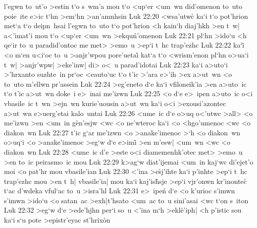 l'egwn
to~ut'o
>estin
t`o
s~wm'a
mou
t`o
<up`er
<um~wn
did'omenon
to~uto
poie~ite
e>ic
t`hn
>em`hn
>an'amnhsin\bibvsend
\vs Luk 22:20
<wsa'utwc\r{}
ka`i
t`o
pot'hrion
met`a
t`o
deipn~hsai
l'egwn
to~uto
t`o
pot'hrion
<h
kain`h
diaj'hkh
>en
t~w|
a<'imat'i
mou
t`o
<up`er
<um~wn
>ekqu\r{n}'omenon\bibvsend
{}
\vs Luk 22:21
pl`hn
>ido`u
<h
qe`ir
to~u
paradid'ontoc
me
met>
>emo~u
>ep`i
t~hc
trap'ezhc\bibvsend
\vs Luk 22:22
ka`i\r{}
<o
m`en
u<i`oc
to~u
>anjr'wpou
pore'uetai\r{}
kat`a
t`o
<wrism'enon
pl`hn
o>ua`i
t~w|
>anjr'wpw|
>eke'inw|
di>
o<~u
parad'idotai\bibvsend
\vs Luk 22:23
ka`i
a>uto`i
>'hrxanto
suzhte~in
pr`oc
<eauto`uc
t`o
t'ic
>'ara
e>'ih
>ex
a>ut~wn
<o
to~uto
m'ellwn
pr'assein\bibvsend
\vs Luk 22:24
>eg'eneto
d`e
ka`i
vfiloneik'ia
>en
a>uto~ic
t`o
t'ic
a>ut~wn
doke~i
e>~inai
me'izwn\bibvsend
\vs Luk 22:25
<o
d`e
e>~ipen
a>uto~ic
o<i
vbasile~ic
t~wn
>ejn~wn
kurie'uousin
a>ut~wn
ka`i
o<i
>exousi'azontec
a>ut~wn
e>uerg'etai
kalo~untai\bibvsend
\vs Luk 22:26
<ume~ic
d`e
o>uq
o<'utwc
>all>
<o
me'izwn
>en
<um~in
g\r{e}n'esjw
<wc
<o
ne'wteroc
ka`i
<o
<hgo'umenoc
<wc
<o
diakon~wn\bibvsend
\vs Luk 22:27
t'ic
g`ar
me'izwn
<o
>anake'imenoc
>`h
<o
diakon~wn
o>uq`i
<o
>anake'imenoc
>eg`w
d`e
e>imi\r{}
>en
m'esw|
<um~wn
<wc
<o
diakon~wn\bibvsend
\vs Luk 22:28
<ume~ic
d'e
>este
o<i
diamemenhk'otec
met>
>emo~u
>en
to~ic
peirasmo~ic
mou\bibvsend
\vs Luk 22:29
k>ag`w
diat'ijemai
<um~in
kaj`wc
di'ejet'o
moi
<o
pat'hr
mou
vbasile'ian\bibvsend
\vs Luk 22:30
<'ina
>e\r{s}j'ihte
ka`i
p'inhte
>ep`i
t~hc
trap'ezhc
mou
>en
t~h|
vbasile'ia|
mou
ka`i
kaj'is\r{h}sje
>ep`i
vjr'onwn
kr'inontec\r{}
t`ac
d'wdeka
vful`ac
to~u
>isra'hl\bibvsend
\vs Luk 22:31
e>~ipen\r{}
d`e
<o
k'urioc
s'imwn
s'imwn
>ido`u
<o
satan~ac
>exh|t'hsato
<um~ac
to~u
sini'asai
<wc
t`on
s~iton\bibvsend
\vs Luk 22:32
>eg`w
d`e
>ede'hjhn
per`i
so~u
<'ina
m`h
>ekl\r{e}'iph|
<h
p'istic
sou
ka`i
s`u
pote
>epistr'eyac
st'hrix\r{o}n
